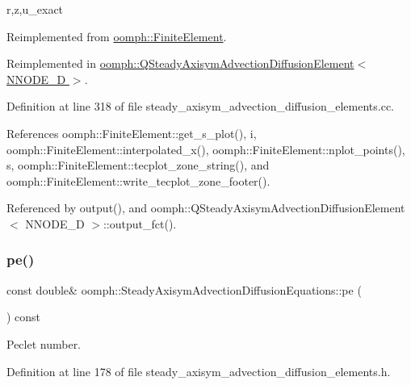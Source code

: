 r,z,u\+\_\+exact 

Reimplemented from \hyperlink{classoomph_1_1FiniteElement_a22b695c714f60ee6cd145be348042035}{oomph\+::\+Finite\+Element}.



Reimplemented in \hyperlink{classoomph_1_1QSteadyAxisymAdvectionDiffusionElement_a6f21bbd8825931be66be210cea87000d}{oomph\+::\+Q\+Steady\+Axisym\+Advection\+Diffusion\+Element$<$ N\+N\+O\+D\+E\+\_\+D $>$}.



Definition at line 318 of file steady\+\_\+axisym\+\_\+advection\+\_\+diffusion\+\_\+elements.\+cc.



References oomph\+::\+Finite\+Element\+::get\+\_\+s\+\_\+plot(), i, oomph\+::\+Finite\+Element\+::interpolated\+\_\+x(), oomph\+::\+Finite\+Element\+::nplot\+\_\+points(), s, oomph\+::\+Finite\+Element\+::tecplot\+\_\+zone\+\_\+string(), and oomph\+::\+Finite\+Element\+::write\+\_\+tecplot\+\_\+zone\+\_\+footer().



Referenced by output(), and oomph\+::\+Q\+Steady\+Axisym\+Advection\+Diffusion\+Element$<$ N\+N\+O\+D\+E\+\_\+D $>$\+::output\+\_\+fct().

\mbox{\label{classoomph_1_1SteadyAxisymAdvectionDiffusionEquations_a2ebfde954ef0bbefd65e15f5f615eae0}} 
\subsubsection{\texorpdfstring{pe()}{pe()}}
{\footnotesize\ttfamily const double\& oomph\+::\+Steady\+Axisym\+Advection\+Diffusion\+Equations\+::pe (\begin{DoxyParamCaption}{ }\end{DoxyParamCaption}) const\hspace{0.3cm}{\ttfamily [inline]}}



Peclet number. 



Definition at line 178 of file steady\+\_\+axisym\+\_\+advection\+\_\+diffusion\+\_\+elements.\+h.



